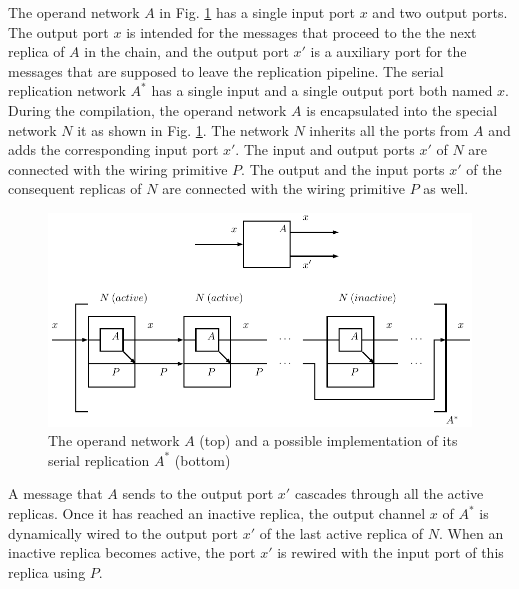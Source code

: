The operand network $A$ in Fig. \ref{fig:ffp_new} has a single input port $x$ and two output ports. The output port $x$ is intended for the messages that proceed to the the next replica of $A$ in the chain, and the output port $x'$ is a auxiliary port for the messages that are supposed to leave the replication pipeline. The serial replication network $A^{*}$ has a single input and a single output port both named $x$. During the compilation, the operand network $A$ is encapsulated into the special network $N$ it as shown in Fig. \ref{fig:ffp_new}. The network $N$ inherits all the ports from $A$ and adds the corresponding input port $x'$. The input and output ports $x'$ of $N$ are connected with the wiring primitive $P$. The output and the input ports $x'$ of the consequent replicas of $N$ are connected with the wiring primitive $P$ as well.
\begin{figure}[h!]
\centering
\includegraphics[scale=0.8]{figs/chapter_04_ffp_new.pdf}
\caption{The operand network $A$ (top) and a possible implementation of its serial replication $A^{*}$ (bottom)}
\label{fig:ffp_new}
\end{figure}
A message that $A$ sends to the output port $x'$ cascades through all the active replicas. Once it has reached an inactive replica, the output channel $x$ of $A^{*}$ is dynamically wired to the output port $x'$ of the last active replica of $N$. When an inactive replica becomes active, the port $x'$ is rewired with the input port of this replica using $P$.



%



